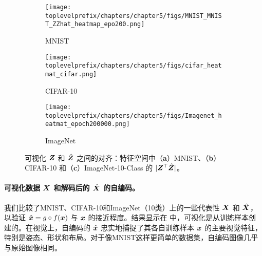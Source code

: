 \documentclass[../../book-main.tex]{subfiles}
\begin{document}
\begin{figure}[t]
    \begin{subfigure}[t]{0.3\textwidth}
        \centering
        \texttt{[image: \\toplevelprefix/chapters/chapter5/figs/MNIST\_MNIST\_ZZhat\_heatmap\_epo200.png]}
        \caption{MNIST}
    \end{subfigure}
    \hfill
    \begin{subfigure}[t]{0.3\textwidth}
        \centering
        \texttt{[image: \\toplevelprefix/chapters/chapter5/figs/cifar\_heatmat\_cifar.png]}
        \caption{CIFAR-10}
    \end{subfigure}
    \hfill
    \begin{subfigure}[t]{0.3\textwidth}
        \centering
        \texttt{[image: \\toplevelprefix/chapters/chapter5/figs/Imagenet\_heatmat\_epoch200000.png]}
        \caption{ImageNet}
    \end{subfigure}
    \caption{可视化 $\bm{Z}$ 和 $\hat{\bm{Z}}$ 之间的对齐：特征空间中（\textbf{a}）MNIST、（\textbf{b}）CIFAR-10 和（\textbf{c}）ImageNet-10-Class 的 $|\bm{Z}^\top \hat{\bm{Z}}|$。}
    \label{fig:justifyz=z}
\end{figure}
 





\paragraph{可视化数据 $\bm{X}$ 和解码后的 $\hat {\bm{X}}$ 的自编码。} 我们比较了MNIST、CIFAR-10和ImageNet（10类）上的一些代表性 $\bm{X}$ 和 $\hat{\bm{X}}$，以验证 $\hat {\bm{x}} = g\circ f(\bm{x})$ 与 $\bm{x}$ 的接近程度。结果显示在  中，可视化是从训练样本创建的。在视觉上，自编码的 $\hat {\bm{x}}$ 忠实地捕捉了其各自训练样本 $\bm{x}$ 的主要视觉特征，特别是姿态、形状和布局。对于像MNIST这样更简单的数据集，自编码图像几乎与原始图像相同。
\end{document}

